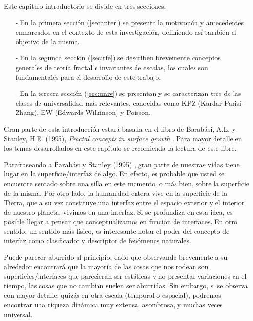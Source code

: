 \graphicspath{{figs/cap2}}

Este capítulo introductorio se divide en tres secciones: 

\begin{itemize}
    \item[-] En la primera sección (\ref{sec:inter}) se presenta la motivación y antecedentes enmarcados en el contexto de esta investigación, definiendo 
    así también el objetivo de la misma.
    \item[-] En la segunda sección (\ref{sec:tfe}) se describen brevemente conceptos generales de teoría fractal e invariantes de escalas, los cuales son
    fundamentales para el desarrollo de este trabajo.
    \item[-] En la tercera sección (\ref{sec:univ}) se presentan y se caracterizan tres de las clases de universalidad más relevantes, conocidas como 
    KPZ (Kardar-Parisi-Zhang), EW (Edwards-Wilkinson) y Poisson.
\end{itemize}

Gran parte de esta introducción estará basada en el libro de 
Barabási, A.L. y Stanley, H.E. (1995), \textit{Fractal concepts in surface growth} \cite{barabasi}. Para mayor detalle en los temas desarrollados en este capítulo
se recomienda la lectura de este libro.


Parafraseando a Barabási y Stanley (1995) \cite{barabasi}, gran parte de nuestras vidas tiene lugar en la superficie/interfaz de algo. En efecto, es probable que usted se 
encuentre sentado sobre una silla en este momento, o más bien, sobre la superficie de la misma. Por otro lado, la humanidad entera vive en la superficie de la Tierra, que 
a su vez constituye una interfaz entre el espacio exterior y el interior de nuestro planeta, vivimos en una interfaz. Si se profundiza en esta idea, es posible 
llegar a pensar que conceptualizamos en función de interfaces. En otro sentido, un sentido más físico, es interesante notar el poder del concepto de interfaz como 
clasificador y descriptor de fenómenos naturales. 

Puede parecer aburrido al principio, dado que observando brevemente a su alrededor encontrará que la mayoría de las cosas que nos rodean son superficies/interfaces que 
parecieran ser estáticas y no presentar variaciones en el tiempo, las cosas que no cambian suelen ser aburridas. Sin embargo, si se observa 
con mayor detalle, quizás en otra escala (temporal o espacial), podremos encontrar una riqueza dinámica muy extensa, asombrosa, y muchas veces universal.

